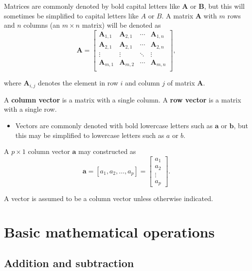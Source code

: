 \documentclass[
]{book}
\providecommand{\tightlist}{%
  \setlength{\itemsep}{0pt}\setlength{\parskip}{0pt}}
\theoremstyle{definition}
\theoremstyle{definition}
\theoremstyle{definition}
\theoremstyle{definition}
\theoremstyle{remark}
\begin{document}
Matrices are commonly denoted by bold capital letters like \(\mathbf{A}\) or \(\mathbf{B}\), but this will sometimes be simplified to capital letters like \(A\) or \(B\). A matrix \(\mathbf{A}\) with \(m\) rows and \(n\) columns (an \(m\times n\) matrix) will be denoted as
\[\mathbf{A} = \begin{bmatrix}
\mathbf{A}_{1,1} & \mathbf{A}_{2,1} & \cdots & \mathbf{A}_{1,n} \\
\mathbf{A}_{2,1} & \mathbf{A}_{2,1} & \cdots & \mathbf{A}_{2,n} \\
\vdots & \vdots & \ddots & \vdots \\
\mathbf{A}_{m,1} & \mathbf{A}_{m,2} & \cdots & \mathbf{A}_{m,n} \\
\end{bmatrix},
\]

where \(\mathbf{A}_{i,j}\) denotes the element in row \(i\) and column \(j\) of matrix \(\mathbf{A}\).

A \textbf{column vector} is a matrix with a single column. A \textbf{row vector} is a matrix with a single row.

\begin{itemize}
\tightlist
\item
  Vectors are commonly denoted with bold lowercase letters such as \(\mathbf{a}\) or \(\mathbf{b}\), but this may be simplified to lowercase letters such as \(a\) or \(b\).
\end{itemize}

A \(p\times 1\) column vector \(\mathbf{a}\) may constructed as
\[
\mathbf{a} = [a_1, a_2, \ldots, a_p] = 
\begin{bmatrix}
a_1 \\ a_2 \\ \vdots \\ a_p
\end{bmatrix}.
\]

A vector is assumed to be a column vector unless otherwise indicated.

\hypertarget{basic-mathematical-operations}{%
\section{Basic mathematical operations}\label{basic-mathematical-operations}}

\hypertarget{addition-and-subtraction}{%
\subsection{Addition and subtraction}\label{addition-and-subtraction}}
\end{document}
